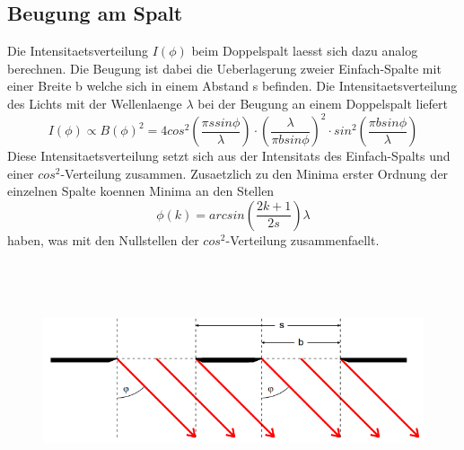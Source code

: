 \subsection{Beugung am Spalt}
Die Intensitaetsverteilung $I(\phi)$ beim Doppelspalt laesst sich dazu analog berechnen. Die Beugung ist dabei die Ueberlagerung zweier Einfach-Spalte mit einer Breite b welche sich in einem Abstand s befinden. Die Intensitaetsverteilung des Lichts mit der Wellenlaenge $\lambda$ bei der Beugung an einem Doppelspalt liefert
\begin{equation*}
    I(\phi)\propto B(\phi)^2=4cos^2(\frac{\pi ssin\phi}{\lambda})\cdot(\frac{\lambda}{\pi bsin\phi})^2\cdot sin^2(\frac{\pi bsin\phi}{\lambda})
\end{equation*}
Diese Intensitaetsverteilung setzt sich aus der Intensitats des Einfach-Spalts und einer $cos^2$-Verteilung zusammen. Zusaetzlich zu den Minima erster Ordnung der einzelnen Spalte koennen Minima an den Stellen
\begin{equation*}
    \phi(k)=arcsin(\frac{2k+1}{2s})\lambda
\end{equation*} 
haben, was mit den Nullstellen der $cos^2$-Verteilung zusammenfaellt.
\begin{figure}[H]
    \centering
    \captionsetup{justification=centering}
    \includegraphics[height=7cm]{"Doppelspalt_BeugungSpalt.png"}
    \label{Fig:Doppelspalt}
\end{figure}
